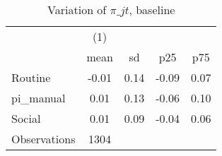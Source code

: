 \begin{table}[htbp]\centering
\def\sym#1{\ifmmode^{#1}\else\(^{#1}\)\fi}
\caption{Variation of $\pi\_{jt}$, baseline}
\begin{tabular}{l*{1}{cccc}}
\toprule
                    &\multicolumn{1}{c}{(1)}&            &            &            \\
                    &        mean&          sd&         p25&         p75\\
\midrule
Routine             &       -0.01&        0.14&       -0.09&        0.07\\
pi\_manual           &        0.01&        0.13&       -0.06&        0.10\\
Social              &        0.01&        0.09&       -0.04&        0.06\\
\midrule
Observations        &        1304&            &            &            \\
\bottomrule
\end{tabular}
\end{table}
